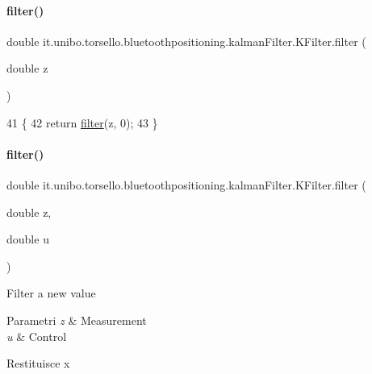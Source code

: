\paragraph{\texorpdfstring{filter()}{filter()}\hspace{0.1cm}{\footnotesize\ttfamily [1/2]}}
{\footnotesize\ttfamily double it.\+unibo.\+torsello.\+bluetoothpositioning.\+kalman\+Filter.\+K\+Filter.\+filter (\begin{DoxyParamCaption}\item[{double}]{z }\end{DoxyParamCaption})}


\begin{DoxyCode}
41                                    \{
42         \textcolor{keywordflow}{return} \hyperlink{classit_1_1unibo_1_1torsello_1_1bluetoothpositioning_1_1kalmanFilter_1_1KFilter_a6904818e94d959f8e25a8699d6885c21_a6904818e94d959f8e25a8699d6885c21}{filter}(z, 0);
43     \}
\end{DoxyCode}
\hypertarget{classit_1_1unibo_1_1torsello_1_1bluetoothpositioning_1_1kalmanFilter_1_1KFilter_a376767db8e40babdacbbc9165a50a1a2_a376767db8e40babdacbbc9165a50a1a2}{}\label{classit_1_1unibo_1_1torsello_1_1bluetoothpositioning_1_1kalmanFilter_1_1KFilter_a376767db8e40babdacbbc9165a50a1a2_a376767db8e40babdacbbc9165a50a1a2} 
\paragraph{\texorpdfstring{filter()}{filter()}\hspace{0.1cm}{\footnotesize\ttfamily [2/2]}}
{\footnotesize\ttfamily double it.\+unibo.\+torsello.\+bluetoothpositioning.\+kalman\+Filter.\+K\+Filter.\+filter (\begin{DoxyParamCaption}\item[{double}]{z,  }\item[{double}]{u }\end{DoxyParamCaption})}

Filter a new value


\begin{DoxyParams}{Parametri}
{\em z} & Measurement \\
\hline
{\em u} & Control \\
\hline
\end{DoxyParams}
\begin{DoxyReturn}{Restituisce}
x 
\end{DoxyReturn}

